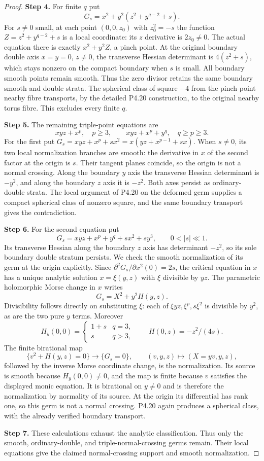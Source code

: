 \begin{proof}
\noindent\textbf{Step 4.} For finite $q$ put
\[
 G_s=x^2+y^2(z^2+y^{q-2}+s).
\]
For $s\ne0$ small, at each point
$(0,0,z_0)$ with $z_0^2=-s$ the function
$Z=z^2+y^{q-2}+s$ is a local coordinate:
its $z$ derivative is $2z_0\ne0$.
The actual equation there is exactly
$x^2+y^2Z$, a pinch point. At the original
boundary double axis $x=y=0$, $z\ne0$,
the transverse Hessian determinant is
$4(z^2+s)$, which stays nonzero on the
compact boundary when $s$ is small.
All boundary smooth points remain smooth.
Thus the zero divisor retains the same
boundary smooth and double strata.
The spherical class of square $-4$
from the pinch-point nearby fibre transports,
by the detailed P4.20 construction, to
the original nearby torus fibre.
This excludes every finite $q$.

\noindent\textbf{Step 5.} The remaining triple-point equations are
\[
 xyz+x^p,\quad p\ge3,\qquad
 xyz+x^p+y^q,\quad q\ge p\ge3.
\]
For the first put
$G_s=xyz+x^p+s x^2
=x(yz+x^{p-1}+s x)$.
When $s\ne0$, its two local normalization
branches are smooth: the derivative in $x$
of the second factor at the origin is $s$.
Their tangent planes coincide, so the
origin is not a normal crossing. Along
the boundary $y$ axis the transverse
Hessian determinant is $-y^2$, and along
the boundary $z$ axis it is $-z^2$.
Both axes persist as ordinary-double
strata. The local argument of P4.20 on
the deformed germ supplies a compact
spherical class of nonzero square, and
the same boundary transport gives the
contradiction.

\noindent\textbf{Step 6.} For the second equation put
\[
 G_s=xyz+x^p+y^q+s x^2+s y^3,
 \qquad 0<|s|\ll1.
\]
Its transverse Hessian along the boundary
$z$ axis has determinant $-z^2$,
so its sole boundary double stratum
persists. We check the smooth normalization
of its germ at the origin explicitly.
Since $\partial^2G_s/\partial x^2(0)=2s$,
the critical equation in $x$ has a unique
analytic solution $x=\xi(y,z)$ with
$\xi$ divisible by $yz$. The parametric
holomorphic Morse change in $x$ writes
\[
 G_s=X^2+y^2H(y,z).
\]
Divisibility follows directly on substituting
$\xi$: each of $\xi yz,\xi^p,s\xi^2$
is divisible by $y^2$, as are the two
pure $y$ terms. Moreover
\[
 H_y(0,0)=
 \begin{cases}1+s&q=3,\\s&q>3,\end{cases}
 \qquad H(0,z)=-z^2/(4s).
\]
The finite
birational map
\[
 \{v^2+H(y,z)=0\}\longrightarrow\{G_s=0\},
 \qquad (v,y,z)\longmapsto(X=yv,y,z),
\]
followed by the inverse Morse coordinate
change, is the normalization. Its source
is smooth because $H_y(0,0)\ne0$,
and the map is finite because $v$
satisfies the displayed monic equation.
It is birational on $y\ne0$ and is
therefore the normalization by normality
of its source. At the origin its
differential has rank one, so this germ
is not a normal crossing. P4.20 again
produces a spherical class, with the
already verified boundary transport.

\noindent\textbf{Step 7.} These calculations exhaust the analytic
classification. Thus only the smooth,
ordinary-double, and triple-normal-crossing
germs remain. Their local equations give
the claimed normal-crossing support and
smooth normalization.
\end{proof}


